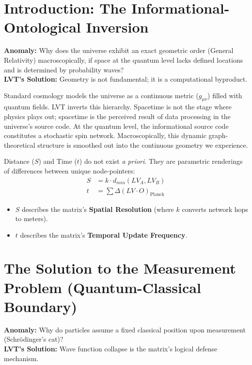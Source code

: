 \documentclass[12pt,a4paper]{article}
\begin{document}
\section{Introduction: The Informational-Ontological Inversion}

\textbf{Anomaly:} Why does the universe exhibit an exact geometric order (General Relativity) macroscopically, if space at the quantum level lacks defined locations and is determined by probability waves? \\
\textbf{LVT's Solution:} Geometry is not fundamental; it is a computational byproduct.

Standard cosmology models the universe as a continuous metric ($g_{\mu\nu}$) filled with quantum fields. LVT inverts this hierarchy. Spacetime is not the stage where physics plays out; spacetime is the perceived result of data processing in the universe's source code. At the quantum level, the informational source code constitutes a stochastic spin network. Macroscopically, this dynamic graph-theoretical structure is smoothed out into the continuous geometry we experience. 

Distance ($S$) and Time ($t$) do not exist \textit{a priori}. They are parametric renderings of differences between unique node-pointers:
\begin{align}
S &= k \cdot d_{min}(LV_A, LV_B) \\
t &= \sum \Delta(LV \cdot O)_{\text{Planck}}
\end{align}
\begin{itemize}
    \item $S$ describes the matrix's \textbf{Spatial Resolution} (where $k$ converts network hops to meters).
    \item $t$ describes the matrix's \textbf{Temporal Update Frequency}.
\end{itemize}

\section{The Solution to the Measurement Problem (Quantum-Classical Boundary)}

\textbf{Anomaly:} Why do particles assume a fixed classical position upon measurement (Schrödinger's cat)? \\
\textbf{LVT's Solution:} Wave function collapse is the matrix's logical defense mechanism.
\end{document}
